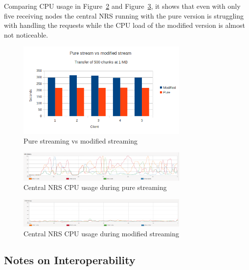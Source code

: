 Comparing CPU usage in Figure~\ref{fig:eval-stream-pure-cpu} and Figure~\ref{fig:eval-stream-mod-cpu}, it shows that even with only five receiving nodes the central NRS running with the pure version is struggling with handling the requests while the CPU load of the modified version is almost not noticeable.

\begin{figure}[h!]
	\centering
		\includegraphics[width=0.75\textwidth]{./img/eval-stream-plot-modvspure.png}
    	\caption{Pure streaming vs modified streaming}
	\label{fig:eval-stream-modvspure}
\end{figure}

\begin{figure}[h!]
	\centering
		\includegraphics[width=0.75\textwidth]{./img/eval-stream-pure-cpu.png}
    	\caption{Central NRS CPU usage during pure streaming}
	\label{fig:eval-stream-pure-cpu}
\end{figure}

\begin{figure}[h!]
	\centering
		\includegraphics[width=0.75\textwidth]{./img/eval-stream-mod-cpu.png}
    	\caption{Central NRS CPU usage during modified streaming}
	\label{fig:eval-stream-mod-cpu}
\end{figure}



\subsection{Notes on Interoperability}

